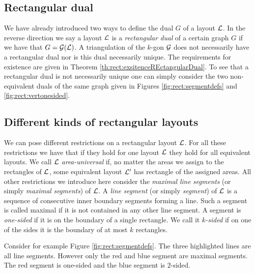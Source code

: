 \subsection{Rectangular dual}
  We have already introduced two ways to define the dual $G$ of a layout $\mathcal{L}$. In the reverse direction we say a layout $\mathcal{L}$ is a \emph{rectangular dual} of a certain graph $G$ if we have that $G = \mathcal{G}(\mathcal{L})$.
  A triangulation of the $k$-gon $\mathcal{G}$ does not necessarily have a rectangular dual nor is this dual necessarily unique. The requirements for existence are given in Theorem \ref{th:rect:exsitenceREctangularDual}.
  To see that a rectangular  dual is not necessarily unique one can simply consider the two non-equivalent duals of the same graph given in Figures \ref{fig:rect:segmentdefs} and \ref{fig:rect:vertonesided}.



\subsection{Different kinds of rectangular layouts}
  We can pose different restrictions on a rectangular layout $\mathcal{L}$. For all these restrictions we have that if they hold for one layout $\mathcal{L}$ they hold for all equivalent layouts.
  We call $\mathcal{L}$ \emph{area-universal} if, no matter the areas we assign to the rectangles of $\mathcal{L}$, some equivalent layout $\mathcal{L}'$ has rectangle of the assigned areas.
  All other restrictions we introduce here consider the \emph{maximal line segments} (or simply \emph{maximal segments}) of $\mathcal{L}$. A \emph{line segment} (or simply \emph{segment}) of $\mathcal{L}$ is a sequence of consecutive inner boundary segments forming a line. Such a segment is called maximal if it is not contained in any other line segment.
  A segment is \emph{one-sided} if it is on the boundary of a single rectangle. We call it \emph{$k$-sided} if on one of the sides it is the boundary of at most $k$ rectangles.

  Consider for example Figure \ref{fig:rect:segmentdefs}. The three highlighted lines are all line segments. However only the red and blue segment are maximal segments. The red segment is one-sided and the blue segment is $2$-sided.

